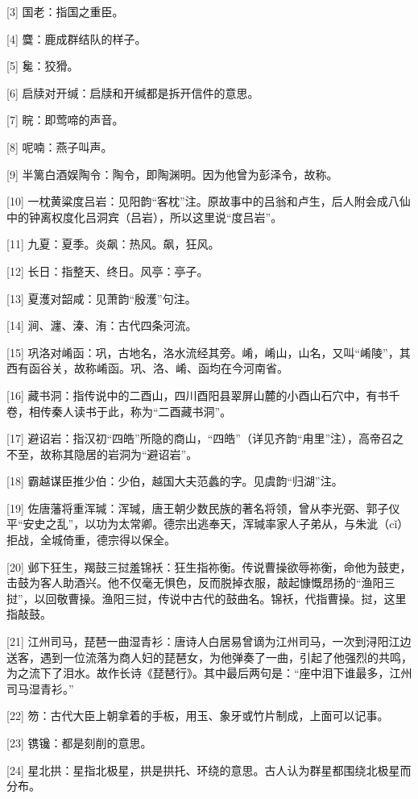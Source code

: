 \documentclass[12pt,UTF8]{ctexbook}
\begin{document}
[3] 国老：指国之重臣。

[4] 麌：鹿成群结队的样子。

[5] 毚：狡猾。

[6] 启牍对开缄：启牍和开缄都是拆开信件的意思。

[7] 睆：即莺啼的声音。

[8] 呢喃：燕子叫声。

[9] 半篱白酒娱陶令：陶令，即陶渊明。因为他曾为彭泽令，故称。

[10] 一枕黄粱度吕岩：见阳韵“客枕”注。原故事中的吕翁和卢生，后人附会成八仙中的钟离权度化吕洞宾（吕岩），所以这里说“度吕岩”。

[11] 九夏：夏季。炎飙：热风。飙，狂风。

[12] 长日：指整天、终日。风亭：亭子。

[13] 夏濩对韶咸：见萧韵“殷濩”句注。

[14] 涧、瀍、溱、洧：古代四条河流。

[15] 巩洛对崤函：巩，古地名，洛水流经其旁。崤，崤山，山名，又叫“崤陵”，其西有函谷关，故称崤函。巩、洛、崤、函均在今河南省。

[16] 藏书洞：指传说中的二酉山，四川酉阳县翠屏山麓的小酉山石穴中，有书千卷，相传秦人读书于此，称为“二酉藏书洞”。

[17] 避诏岩：指汉初“四皓”所隐的商山，“四皓”（详见齐韵“甪里”注），高帝召之不至，故称其隐居的岩洞为“避诏岩”。

[18] 霸越谋臣推少伯：少伯，越国大夫范蠡的字。见虞韵“归湖”注。

[19] 佐唐藩将重浑瑊：浑瑊，唐王朝少数民族的著名将领，曾从李光弼、郭子仪平“安史之乱”，以功为太常卿。德宗出逃奉天，浑瑊率家人子弟从，与朱泚（cǐ）拒战，全城倚重，德宗得以保全。

[20] 邺下狂生，羯鼓三挝羞锦袄：狂生指祢衡。传说曹操欲辱祢衡，命他为鼓吏，击鼓为客人助酒兴。他不仅毫无惧色，反而脱掉衣服，敲起慷慨昂扬的“渔阳三挝”，以回敬曹操。渔阳三挝，传说中古代的鼓曲名。锦袄，代指曹操。挝，这里指敲鼓。

[21] 江州司马，琵琶一曲湿青衫：唐诗人白居易曾谪为江州司马，一次到浔阳江边送客，遇到一位流落为商人妇的琵琶女，为他弹奏了一曲，引起了他强烈的共鸣，为之流下了泪水。故作长诗《琵琶行》。其中最后两句是：“座中泪下谁最多，江州司马湿青衫。”

[22] 笏：古代大臣上朝拿着的手板，用玉、象牙或竹片制成，上面可以记事。

[23] 镌镵：都是刻削的意思。

[24] 星北拱：星指北极星，拱是拱托、环绕的意思。古人认为群星都围绕北极星而分布。
\end{document}
